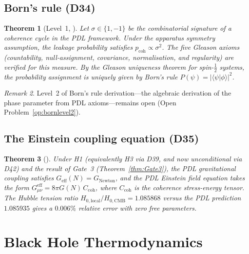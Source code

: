 \documentclass[11pt,a4paper]{article}
\theoremstyle{plain}
\newtheorem{theorem}{Theorem}[section]
\theoremstyle{definition}
\theoremstyle{remark}
\newtheorem{remark}[theorem]{Remark}
\begin{document}
\subsection{Born's rule (D34)}
\label{subsec:born}
\begin{theorem}[Level~1, \cite{D34}]
\label{thm:Born}
Let $\sigma\in\{1,-1\}$ be the combinatorial signature of a coherence cycle in the PDL framework. Under the apparatus symmetry assumption, the leakage probability satisfies $p_{\mathrm{coh}}\propto\sigma^2$. The five Gleason axioms (countability, null-assignment, covariance, normalisation, and regularity) are verified for this measure. By the Gleason uniqueness theorem for spin-$\tfrac{1}{2}$ systems, the probability assignment is uniquely given by Born's rule $P(\psi)=|\langle\psi|\phi\rangle|^2$.
\end{theorem}

\begin{remark}
Level~2 of Born's rule derivation---the algebraic derivation of the phase parameter from PDL axioms---remains open (Open Problem~\ref{op:bornlevel2}).
\end{remark}

\subsection{The Einstein coupling equation (D35)}
\label{subsec:einstein}
\begin{theorem}[\cite{D35}]
\label{thm:Einstein}
Under H1 (equivalently H3 via D39, and now unconditional via D42) and the result of Gate~3 (Theorem~\ref{thm:Gate3}), the PDL gravitational coupling satisfies $G_{\mathrm{eff}}(N)=G_{\mathrm{Newton}}$, and the PDL Einstein field equation takes the form $G_{\mu\nu}^{\mathrm{eff}}=8\pi G(N)\,C_{\mathrm{coh}}$, where $C_{\mathrm{coh}}$ is the coherence stress-energy tensor. The Hubble tension ratio $H_{0,\mathrm{local}}/H_{0,\mathrm{CMB}}=1.085868$ versus the PDL prediction $1.085935$ gives a $0.006\%$ relative error with zero free parameters.
\end{theorem}

\section{Black Hole Thermodynamics}
\label{sec:bh}
\end{document}
